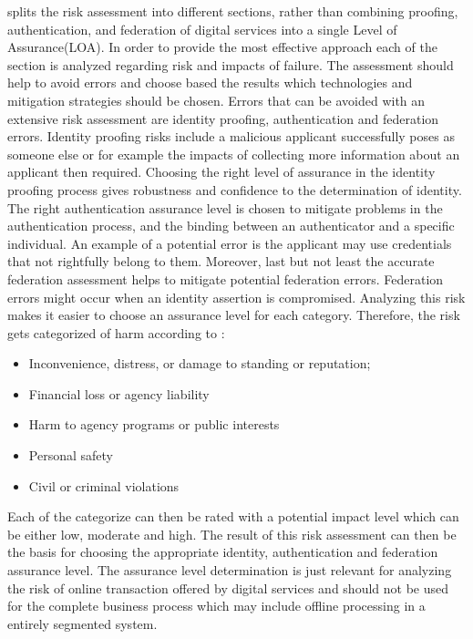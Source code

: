 \cite{NIST:2017:DIG} splits the risk assessment into different sections, rather than combining proofing, authentication, and federation of digital services into a single Level of Assurance(LOA). In order to provide the most effective approach each of the section is analyzed regarding risk and impacts of failure. The assessment should help to avoid errors and choose based the results which technologies and mitigation strategies should be chosen. Errors that can be avoided with an extensive risk assessment are identity proofing, authentication and federation errors. Identity proofing risks include a malicious applicant successfully poses as someone else or for example the impacts of collecting more information about an applicant then required. Choosing the right level of assurance in the identity proofing process gives robustness and confidence to the determination of identity. The right authentication assurance level is chosen to mitigate problems in the authentication process, and the binding between an authenticator and a specific individual. An example of a potential error is the applicant may use credentials that not rightfully belong to them. Moreover, last but not least the accurate federation assessment helps to mitigate potential federation errors. Federation errors might occur when an identity assertion is compromised. Analyzing this risk makes it easier to choose an assurance level for each category. Therefore, the risk gets categorized of harm according to \cite{NIST:2017:DIG}: 

\begin{itemize}
	\item Inconvenience, distress, or damage to standing or reputation;
	\item Financial loss or agency liability
	\item Harm to agency programs or public interests
	\item Personal safety
	\item Civil or criminal violations
\end{itemize}

Each of the categorize can then be rated with a potential impact level which can be either low, moderate and high. The result of this risk assessment can then be the basis for choosing the appropriate identity, authentication and federation assurance level. The assurance level determination is just relevant for analyzing the risk of online transaction offered by digital services and should not be used for the complete business process which may include offline processing in a entirely segmented system. 


